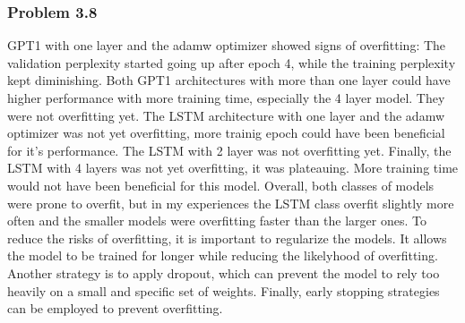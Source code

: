 \documentclass[12pt]{article}
\theoremstyle{definition}
\begin{document}
\subsubsection*{Problem 3.8}
GPT1 with one layer and the adamw optimizer showed signs of overfitting: The
validation perplexity started going up after epoch 4, while the training
perplexity kept diminishing.  Both GPT1 architectures with more than one layer
could have higher performance with more training time, especially the 4 layer
model. They were not overfitting yet.  The LSTM architecture with one layer and
the adamw optimizer was not yet overfitting, more trainig epoch could have been
beneficial for it's performance.  The LSTM with 2 layer was not overfitting yet.
Finally, the LSTM with 4 layers was not yet overfitting, it was plateauing. More
training time would not have been beneficial for this model.  Overall, both
classes of models were prone to overfit, but in my experiences the LSTM class
overfit slightly more often and the smaller models were overfitting faster than
the larger ones. To reduce the risks of overfitting, it is important to
regularize the models. It allows the model to be trained for longer while
reducing the likelyhood of overfitting. Another strategy is to apply dropout,
which can prevent the model to rely too heavily on a small and specific set of
weights. Finally, early stopping strategies can be employed to prevent
overfitting.
\end{document}
